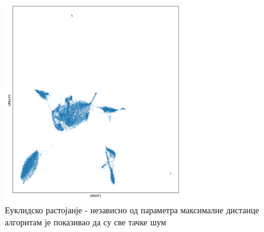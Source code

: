 \documentclass[10pt, a4paper]{article}
\begin{document}
\begin{figure}[H]
    \centering
    \captionsetup{justification=centering}
    \includegraphics[width=0.7\textwidth]{dbscan_euclid.png}
    \caption{Еуклидско растојанје - независно од параметра максималне дистанце алгоритам је показивао да су све тачке шум}
    \label{fig:gustina2}
\end{figure}
\end{document}
